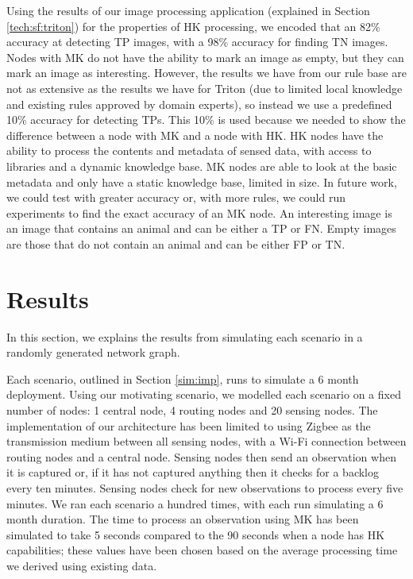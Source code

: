 	Using the results of our image processing application (explained in Section \ref{tech:sf:triton}) for the properties of HK processing, we encoded that an 82\% accuracy at detecting TP images, with a 98\% accuracy for finding TN images. Nodes with MK do not have the ability to mark an image as empty, but they can mark an image as interesting. However, the results we have from our rule base are not as extensive as the results we have for Triton (due to limited local knowledge and existing rules approved by domain experts), so instead we use a predefined 10\% accuracy for detecting TPs. This 10\% is used because we needed to show the difference between a node with MK and a node with HK. HK nodes have the ability to process the contents and metadata of sensed data, with access to libraries and a dynamic knowledge base. MK nodes are able to look at the basic metadata and only have a static knowledge base, limited in size. In future work, we could test with greater accuracy or, with more rules, we could run experiments to find the exact accuracy of an MK node. An interesting image is an image that contains an animal and can be either a TP or FN. Empty images are those that do not contain an animal and can be either FP or TN.
	

\section{Results}\label{sim:res}
In this section, we explains the results from simulating each scenario in a randomly generated network graph. 

Each scenario, outlined in Section \ref{sim:imp}, runs to simulate a 6 month deployment. Using our motivating scenario, we modelled each scenario on a fixed number of nodes: 1 central node, 4 routing nodes and 20 sensing nodes. The implementation of our architecture has been limited to using Zigbee as the transmission medium between all sensing nodes, with a Wi-Fi connection between routing nodes and a central node. Sensing nodes then send an observation when it is captured or, if it has not captured anything then it checks for a backlog every ten minutes. Sensing nodes check for new observations to process every five minutes. We ran each scenario a hundred times, with each run simulating a 6 month duration. The time to process an observation using MK has been simulated to take 5 seconds compared to the 90 seconds when a node has HK capabilities; these values have been chosen based on the average processing time we derived using existing data. 

